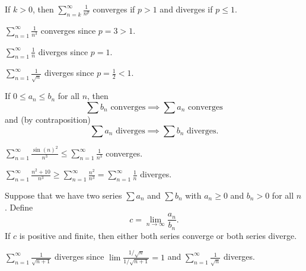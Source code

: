 \begin{thm}
\phantom{}

If $k>0$, then $\displaystyle\sum_{n=k}^\infty\frac{1}{n^p}$ converges if $p>1$ and diverges if $p\leq 1$.
\end{thm}


\begin{exampleblock}
$\displaystyle \sum_{n=1}^\infty \frac{1}{n^3}$ converges since $p=3>1$.
\end{exampleblock}

\begin{exampleblock}
$\displaystyle \sum_{n=1}^\infty \frac{1}{n}$ diverges since $p=1$.
\end{exampleblock}

\begin{exampleblock}
$\displaystyle \sum_{n=1}^\infty \frac{1}{\sqrt{n}}$ diverges since $p=\frac{1}{2}<1$.
\end{exampleblock}


\begin{thm}
If $0\leq a_n\leq b_n$ for all $n$, then
$$\sum b_n\text{ converges}\implies \sum a_n\text{ converges}$$
and (by contraposition)
$$\sum a_n\text{ diverges}\implies \sum b_n\text{ diverges}.$$
\end{thm}


\begin{exampleblock}
$\displaystyle \sum_{n=1}^\infty \frac{\sin(n)^2}{n^3} \leq \sum_{n=1}^\infty \frac{1}{n^3}$ converges.
\end{exampleblock}

\begin{exampleblock}
$\displaystyle \sum_{n=1}^\infty \frac{n^2+10}{n^3} \geq \sum_{n=1}^\infty \frac{n^2}{n^3}=\sum_{n=1}^\infty \frac{1}{n}$ diverges.
\end{exampleblock}



\begin{thm}
Suppose that we have two series $\sum a_n$ and $\sum b_n$ with $a_n\geq 0$ and $b_n > 0$ for all $n$. Define
$$c=\lim_{n\to\infty}\frac{a_n}{b_n}.$$
If $c$ is positive and finite, then either both series converge or both series diverge.
\end{thm}


\begin{exampleblock}
$\displaystyle \sum_{n=1}^\infty \frac{1}{\sqrt{n+1}}$ diverges since $\lim \frac{1/\sqrt{n}}{1/\sqrt{n+1}}=1$ and $\displaystyle\sum_{n=1}^\infty \frac{1}{\sqrt{n}}$ diverges.
\end{exampleblock}


